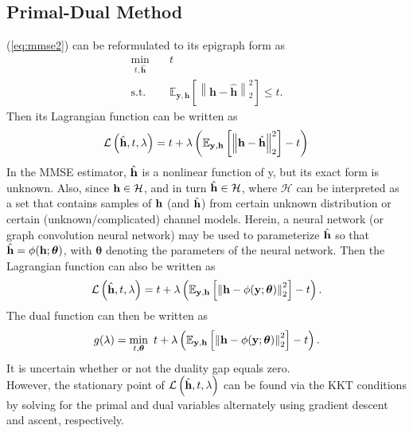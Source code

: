 \documentclass[journal,10pt,twocolumn]{IEEEtran}
\begin{document}
    \subsection{Primal-Dual Method}
        (\ref{eq:mmse2}) can be reformulated to its epigraph form as
        \begin{equation}
        \begin{aligned} \label{eq:epi}
            \min_{t,\hat{\mathbf{h}}} \quad & t \\
            \text{s.t.} \quad & \mathbb{E}_{\mathbf{y},\mathbf{h}}\left[\left\| \mathbf{h}-\hat{\mathbf{h}} \right\|^2_2\right] \leq t.
        \end{aligned}
        \end{equation}
        Then its Lagrangian function can be written as
        \begin{equation} \label{eq:Lag1}
            \mathcal{L} \left(\hat{{\bf h}},t,\lambda\right) = t + \lambda\left(\mathbb{E}_{{\bf y},{\bf h}}\left[\left\| {\bf h}-\hat{{\bf h}} \right\|^2_2 \right] -t \right)\\
        \end{equation}
        In the MMSE estimator, $\hat{{\bf h}}$ is a nonlinear function of y, but its exact form is unknown. Also, since ${\bf h} \in \mathcal{H} $, 
        and in turn $\hat{{\bf h}} \in \mathcal{H} $, where $\mathcal{H}$ can be interpreted as a set that contains samples of ${\bf h}$ (and $\hat{{\bf h}}$) from certain 
        unknown distribution or certain (unknown/complicated) channel models. Herein, a neural network (or graph convolution neural network) may be used to
        parameterize $\hat{{\bf h}}$ so that $\hat{{\bf h}}=\phi({\bf h};\boldsymbol{\theta})$, with $\boldsymbol{\theta}$ denoting the parameters of the neural network.
        Then the Lagrangian function can also be written as
        \begin{equation} \label{eq:Lag2}
            \mathcal{L} \left(\hat{{\bf h}},t,\lambda\right) = t + \lambda\left(\mathbb{E}_{{\bf y},{\bf h}}\left[\left\| {\bf h}-\phi(\mathbf{y};\boldsymbol{\theta}) \right\|^2_2 \right] -t \right).\\
        \end{equation}
        The dual function can then be written as
        \begin{equation} \label{eq:dual}
            g(\lambda) = \min_{t,\boldsymbol{\theta}}~ t + \lambda\left(\mathbb{E}_{{\bf y},{\bf h}}\left[\left\| {\bf h}-\phi(\mathbf{y};\boldsymbol{\theta}) \right\|^2_2 \right] -t \right).\\
        \end{equation}
        It is uncertain whether or not the duality gap equals zero.\\
        However, the stationary point of $  \mathcal{L} \left(\hat{{\bf h}},t,\lambda\right)$ can be found via the KKT conditions by solving for the primal and dual
        variables alternately using gradient descent and ascent, respectively.\\
        
\end{document}
